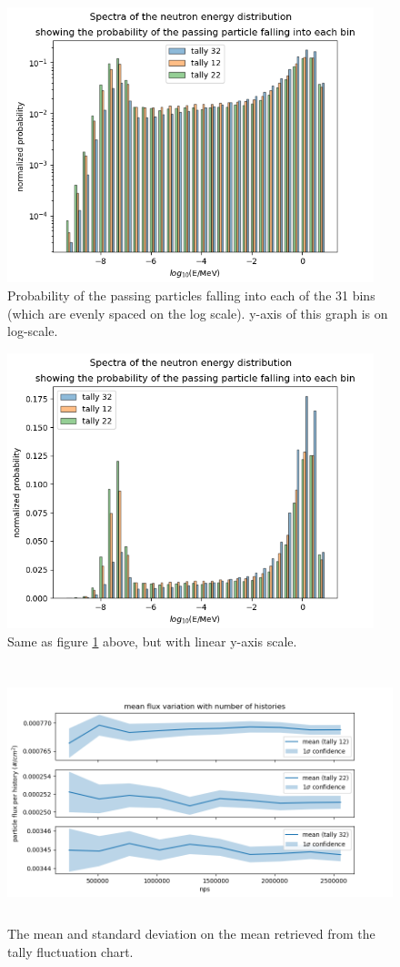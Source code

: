 \documentclass[a4paper, 11pt]{article}
\begin{document}
\begin{appendices}
\begin{figure}[H]
\centering
\includegraphics[height=8cm]{SpectraHist.png}
\caption{Probability of the passing particles falling into each of the 31 bins (which are evenly spaced on the log scale). y-axis of this graph is on log-scale.
}\label{TalliesHistograms}
\end{figure}

\begin{figure}[H]
\centering
\includegraphics[height=8cm]{SpectraHist_lin.png}
\caption{Same as figure \ref{TalliesHistograms} above, but with linear y-axis scale.
}\label{TalliesHistogramsLin}
\end{figure}

\begin{figure}[H]
\centering
\includegraphics[height=7.5cm]{Ex1TallyFluc.png}
\caption{The mean and standard deviation on the mean retrieved from the tally fluctuation chart.
}\label{Ex1TallyFluc}
\end{figure}


\end{appendices}
\end{document}
